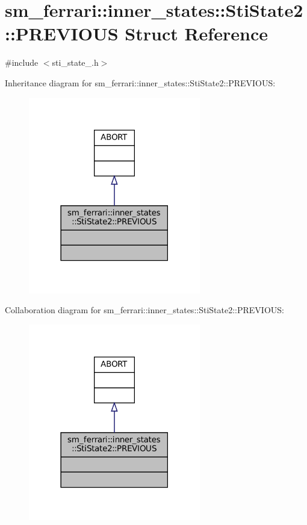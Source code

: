 \hypertarget{structsm__ferrari_1_1inner__states_1_1StiState2_1_1PREVIOUS}{}\section{sm\+\_\+ferrari\+:\+:inner\+\_\+states\+:\+:Sti\+State2\+:\+:P\+R\+E\+V\+I\+O\+US Struct Reference}
\label{structsm__ferrari_1_1inner__states_1_1StiState2_1_1PREVIOUS}


{\ttfamily \#include $<$sti\+\_\+state\+\_.\+h$>$}



Inheritance diagram for sm\+\_\+ferrari\+:\+:inner\+\_\+states\+:\+:Sti\+State2\+:\+:P\+R\+E\+V\+I\+O\+US\+:
\nopagebreak
\begin{figure}[H]
\begin{center}
\leavevmode
\includegraphics[width=213pt]{structsm__ferrari_1_1inner__states_1_1StiState2_1_1PREVIOUS__inherit__graph}
\end{center}
\end{figure}


Collaboration diagram for sm\+\_\+ferrari\+:\+:inner\+\_\+states\+:\+:Sti\+State2\+:\+:P\+R\+E\+V\+I\+O\+US\+:
\nopagebreak
\begin{figure}[H]
\begin{center}
\leavevmode
\includegraphics[width=213pt]{structsm__ferrari_1_1inner__states_1_1StiState2_1_1PREVIOUS__coll__graph}
\end{center}
\end{figure}


